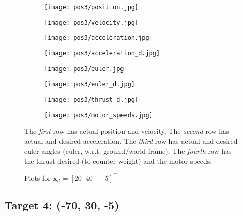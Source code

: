 \begin{figure}[h]
    \centering
    \begin{subfigure}[b]{0.35\textwidth}
        \texttt{[image: pos3/position.jpg]}
    \end{subfigure}
    \begin{subfigure}[b]{0.35\textwidth}
        \texttt{[image: pos3/velocity.jpg]}
    \end{subfigure}
    \begin{subfigure}[b]{0.35\textwidth}
        \texttt{[image: pos3/acceleration.jpg]}
    \end{subfigure}
    \begin{subfigure}[b]{0.35\textwidth}
        \texttt{[image: pos3/acceleration\_d.jpg]}
    \end{subfigure}
    \begin{subfigure}[b]{0.35\textwidth}
        \texttt{[image: pos3/euler.jpg]}
    \end{subfigure}
    \begin{subfigure}[b]{0.35\textwidth}
        \texttt{[image: pos3/euler\_d.jpg]}
    \end{subfigure}
    \begin{subfigure}[b]{0.35\textwidth}
        \texttt{[image: pos3/thrust\_d.jpg]}
    \end{subfigure}
    \begin{subfigure}[b]{0.35\textwidth}
        \texttt{[image: pos3/motor\_speeds.jpg]}
    \end{subfigure}
    \caption{Plots for $\mathbf{x}_d = [20\;\;40\;\;-5]^\top$}
    \small
        The \emph{first} row has actual position and velocity.
        The \emph{second} row has actual and desired acceleration.
        The \emph{third} row has actual and desired euler angles (euler, w.r.t. ground/world frame).
        The \emph{fourth} row has the thrust desired (to counter weight) and the motor speeds.
\end{figure}

\pagebreak
\subsection{Target 4: (-70, 30, -5)}

